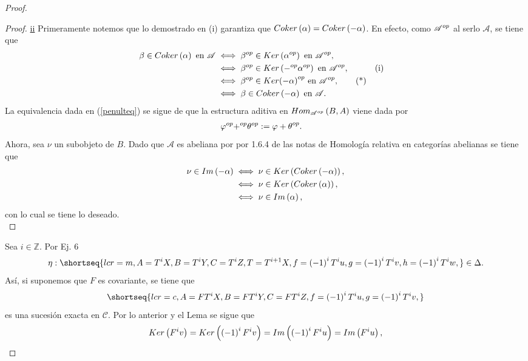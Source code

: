 \documentclass{article}
\begin{document}
\begin{enumerate}[label=\textbf{Ej \arabic*.}]
\begin{proof}
\begin{proof}
			 \underline{ii} Primeramente notemos que lo demostrado en (i) garantiza que $Coker\left(\alpha\right)=Coker\left(-\alpha\right)$. En efecto, como ${\mathscr{A}}^{op}$ al serlo $\mathscr{A}$, se tiene que
			 \begin{align*}
			 	\beta\in Coker\left(\alpha\right)\text{ en }\mathscr{A}&\iff 			 	
			 	{\beta}^{op}\in Ker\left({\alpha}^{op}\right)\text{ en }{\mathscr{A}}^{op},\\
			 	&\iff {\beta}^{op}\in Ker\left({-}^{op}{\alpha}^{op}\right)\text{ en }{\mathscr{A}}^{op}, && \text{(i)}\\
			 	&\iff {\beta}^{op}\in Ker{{\left(-\alpha\right)}^{op}}\text{ en }{\mathscr{A}}^{op},\tag{*}\label{penulteq}\\
			 	&\iff {\beta}\in Coker\left(-\alpha\right)\text{ en }{\mathscr{A}}.	
			 \end{align*}
			La equivalencia dada en (\ref{penulteq}) se sigue de que la estructura aditiva en $Hom_{{\mathscr{A}}^{op}}\left(B,A\right)$ viene dada por \begin{align*}
  		 		{\varphi}^{op}{+}^{op}{\theta}^{op}&:={\varphi+\theta}^{op}.
  		 	\end{align*}
			 Ahora, sea $\nu$ un subobjeto de $B$. Dado que $\mathscr{A}$ es abeliana por por 1.6.4 de las notas de Homología relativa en categorías abelianas se tiene que 
			 \begin{align*}
			 	\nu\in Im\left(-\alpha\right)&\iff \nu\in Ker\left(Coker\left(-\alpha\right)\right),\\
			 	&\iff \nu\in Ker\left(Coker\left(\alpha\right)\right),\\
			 	&\iff \nu\in Im\left(\alpha\right),
			 \end{align*}
		 con lo cual se tiene lo deseado.\\
			\end{proof}
			 Sea $i\in \mathbb{Z}$. Por Ej. 6
			\begin{equation*}
				\eta:\shortseq{lcr=m,A=T^iX,B=T^iY,C=T^iZ,T=T^{i+1}X,f=\lrprth{-1}^iT^iu,g=\lrprth{-1}^iT^iv,h=\lrprth{-1}^iT^iw,}\in\Delta.
			\end{equation*}
			Así, si suponemos que $F$ es covariante, se tiene que
			\begin{equation*}
				\shortseq{lcr=c,A=FT^iX,B=FT^iY,C=FT^iZ,f=\lrprth{-1}^iT^iu,g=\lrprth{-1}^iT^iv,}
			\end{equation*}
		es una sucesión exacta en $\mathscr{C}$. Por lo anterior y el Lema se sigue que
		\begin{equation*}
			Ker\lrprth{F^iv}=Ker\lrprth{\lrprth{-1}^iF^iv}=Im\lrprth{\lrprth{-1}^iF^iu}=Im\lrprth{F^iu},

\end{equation*}
\end{proof}
\end{enumerate}
\end{document}
